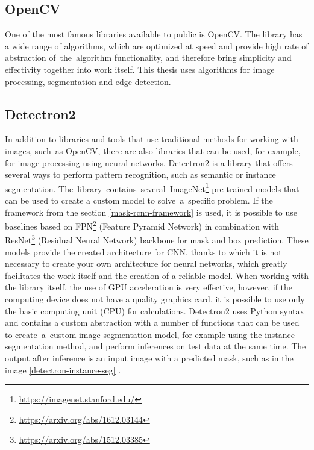 \subsection{OpenCV}
One of the most famous libraries available to public is OpenCV. The library has a wide range of algorithms, which are optimized at speed and provide high rate of abstraction of~the~algorithm functionality, and therefore bring simplicity and effectivity together into work itself. This thesis uses algorithms for image processing, segmentation and edge detection.

\subsection{Detectron2}
In addition to libraries and tools that use traditional methods for working with images, such~as OpenCV, there are also libraries that can be used, for example, for image processing using neural networks. Detectron2 is a library that offers several ways to perform pattern recognition, such as semantic or instance segmentation. The~library~contains~several~ImageNet\footnote{\url{https://imagenet.stanford.edu/}} pre-trained models that can be used to create a custom model to solve~a~specific problem. If the framework from the section \ref{mask-rcnn-framework} is used, it is possible to use baselines based on FPN\footnote{\url{https://arxiv.org/abs/1612.03144}} (Feature Pyramid Network) in combination with ResNet\footnote{\url{https://arxiv.org/abs/1512.03385}} (Residual Neural Network) backbone for mask and box prediction. These models provide the created architecture for CNN, thanks to which it is not necessary to create your own architecture for neural networks, which greatly facilitates the work itself and the creation of a reliable model. When working with the library itself, the use of GPU acceleration is very effective, however, if the computing device does not have a quality graphics card, it is possible to use only the basic computing unit (CPU) for calculations. Detectron2 uses Python syntax and contains a custom abstraction with a number of functions that can be used to create~a~custom image segmentation model, for example using the instance segmentation method, and perform inferences on test data at the same time. The output after inference is an input image with a predicted mask, such as in the image \ref{detectron-instance-seg} \cite{detectron2}.
